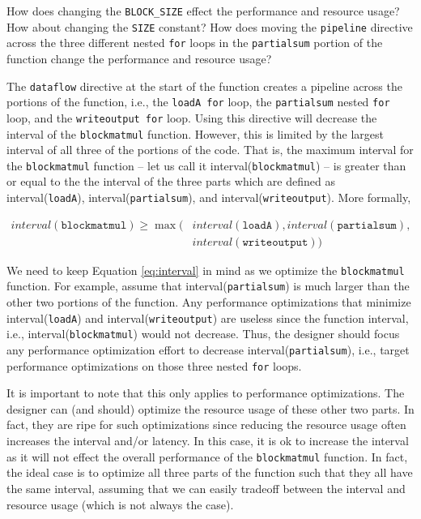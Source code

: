 \begin{exercise}
How does changing the \lstinline{BLOCK_SIZE} effect the performance and resource usage? How about changing the \lstinline{SIZE} constant? How does moving the \lstinline{pipeline} directive across the three different nested \lstinline{for} loops in the \lstinline{partialsum} portion of the function change the performance and resource usage?
\end{exercise}

The \lstinline{dataflow} directive at the start of the function creates a pipeline across the portions of the function, i.e., the \lstinline{loadA for} loop, the \lstinline{partialsum} nested \lstinline{for} loop, and the \lstinline{writeoutput for} loop. Using this directive will decrease the interval of the \lstinline{blockmatmul} function. However, this is limited by the largest interval of all three of the portions of the code. That is, the maximum interval for the \lstinline{blockmatmul} function -- let us call it interval(\lstinline{blockmatmul}) -- is greater than or equal to the the interval of the three parts which are defined as interval(\lstinline{loadA}), interval(\lstinline{partialsum}), and interval(\lstinline{writeoutput}). More formally, 

\begin{align}
\label{eq:interval}
interval(\texttt{blockmatmul}) \ge \max(&interval(\texttt{loadA}), interval(\texttt{partialsum}), \nonumber \\
 & interval(\texttt{writeoutput}))
 \end{align}

We need to keep Equation \ref{eq:interval} in mind as we optimize the \lstinline{blockmatmul} function. For example, assume that interval(\lstinline{partialsum}) is much larger than the other two portions of the function. Any performance optimizations that minimize interval(\lstinline{loadA}) and interval(\lstinline{writeoutput}) are useless since the function interval, i.e., interval(\lstinline{blockmatmul}) would not decrease. Thus, the designer should focus any performance optimization effort to decrease interval(\lstinline{partialsum}), i.e., target performance optimizations on those three nested \lstinline{for} loops. 

It is important to note that this only applies to performance optimizations. The designer can (and should) optimize the resource usage of these other two parts. In fact, they are ripe for such optimizations since reducing the resource usage often increases the interval and/or latency. In this case, it is ok to increase the interval as it will not effect the overall performance of the \lstinline{blockmatmul} function. In fact, the ideal case is to optimize all three parts of the function such that they all have the same interval, assuming that we can easily tradeoff between the interval and resource usage (which is not always the case). 

